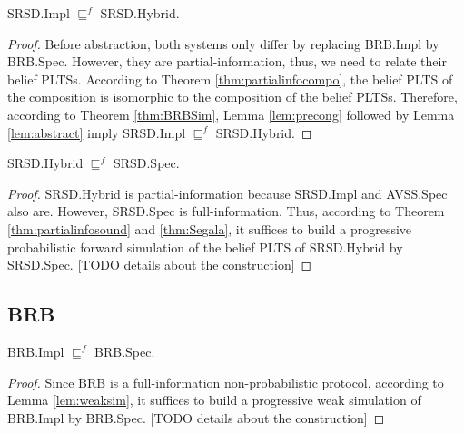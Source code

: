 \begin{lemma}
    \label{lem:SRSDSubst}
    \textsf{SRSD.Impl} $\sqsubseteq^f$ \textsf{SRSD.Hybrid}.
\end{lemma}
\begin{proof}
    Before abstraction, both systems only differ by replacing \textsf{BRB.Impl} by
    \textsf{BRB.Spec}. However, they are partial-information, thus, we need
    to relate their belief PLTSs. According to Theorem \ref{thm:partialinfocompo},
    the belief PLTS of the composition is isomorphic to the composition of the
    belief PLTSs. Therefore, according to Theorem \ref{thm:BRBSim},
    Lemma \ref{lem:precong} followed by Lemma \ref{lem:abstract} imply \textsf{SRSD.Impl}
    $\sqsubseteq^f$ \textsf{SRSD.Hybrid}.
\end{proof}

\begin{lemma}\label{lem:SRSDCore}
    \textsf{SRSD.Hybrid} $\sqsubseteq^f$ \textsf{SRSD.Spec}.
\end{lemma}
\begin{proof}
    \textsf{SRSD.Hybrid} is partial-information because \textsf{SRSD.Impl} and
    \textsf{AVSS.Spec} also are. However, \textsf{SRSD.Spec} is
    full-information. Thus, according to Theorem \ref{thm:partialinfosound} and
    \ref{thm:Segala}, it suffices to build a progressive probabilistic forward
    simulation of the belief PLTS of \textsf{SRSD.Hybrid} by \textsf{SRSD.Spec}.
    [TODO details about the construction]
\end{proof}

\subsection{BRB}

\begin{theorem}
    \label{thm:BRBSim}
    \textsf{BRB.Impl} $\sqsubseteq^f$ \textsf{BRB.Spec}.
\end{theorem}
\begin{proof}
    Since \textsf{BRB} is a full-information non-probabilistic protocol,
    according to Lemma \ref{lem:weaksim}, it suffices to build a progressive
    weak simulation of \textsf{BRB.Impl} by \textsf{BRB.Spec}.
    [TODO details about the construction]
\end{proof}
